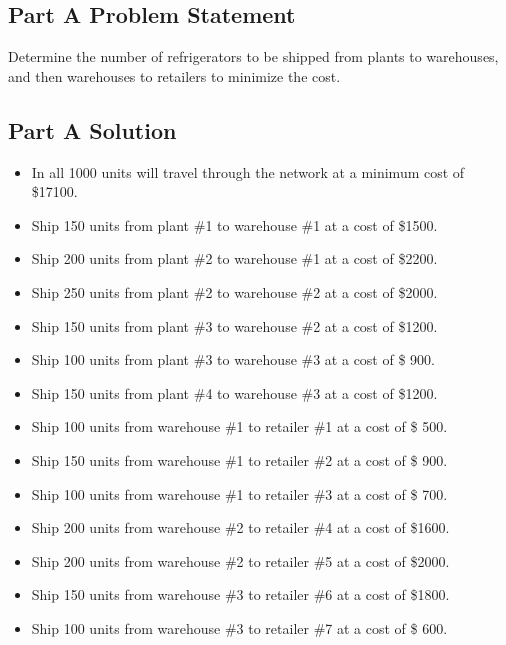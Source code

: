 \documentclass[../report/main.tex]{subfiles}
\begin{document}
\subsection*{Part A Problem Statement}
Determine the number of refrigerators to be shipped from plants to warehouses, and then warehouses to retailers to minimize the cost.

\subsection*{Part A Solution}
\begin{itemize}
	\item In all 1000 units will travel through the network at a minimum cost of \$17100.
	\newline
	\item Ship 150 units from plant \#1 to warehouse \#1 at a cost of \$1500.
	\item Ship 200 units from plant \#2 to warehouse \#1 at a cost of \$2200.
	\item Ship 250 units from plant \#2 to warehouse \#2 at a cost of \$2000.
	\item Ship 150 units from plant \#3 to warehouse \#2 at a cost of \$1200.
	\item Ship 100 units from plant \#3 to warehouse \#3 at a cost of \$ 900.
	\item Ship 150 units from plant \#4 to warehouse \#3 at a cost of \$1200.
	\newline
	\item Ship 100 units from warehouse \#1 to retailer \#1 at a cost of \$ 500.
	\item Ship 150 units from warehouse \#1 to retailer \#2 at a cost of \$ 900.
	\item Ship 100 units from warehouse \#1 to retailer \#3 at a cost of \$ 700.
	\item Ship 200 units from warehouse \#2 to retailer \#4 at a cost of \$1600.
	\item Ship 200 units from warehouse \#2 to retailer \#5 at a cost of \$2000.
	\item Ship 150 units from warehouse \#3 to retailer \#6 at a cost of \$1800.
	\item Ship 100 units from warehouse \#3 to retailer \#7 at a cost of \$ 600.
	\newline

\end{itemize}
\end{document}

